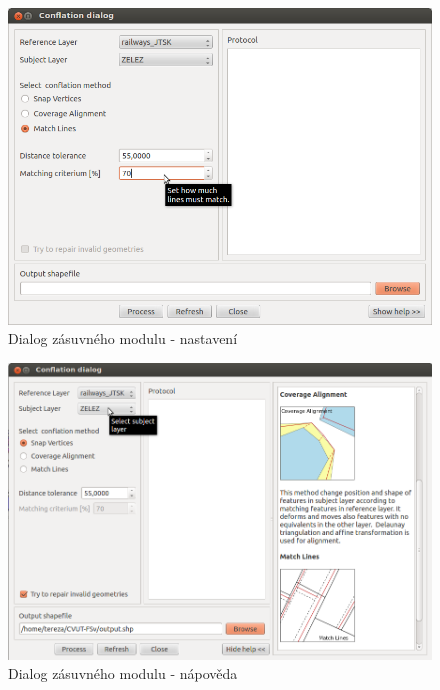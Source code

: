   \begin{figure}[H]
    \centering
      \includegraphics[width=360pt]{./pictures/dialog1.png}
      \caption{Dialog zásuvného modulu - nastavení}
      \label{fig:d1}
  \end{figure} 

  \begin{figure}[H]
    \centering
      \includegraphics[width=360pt]{./pictures/dialog2.png}
      \caption{Dialog zásuvného modulu - nápověda}
      \label{fig:d2}
  \end{figure} 


